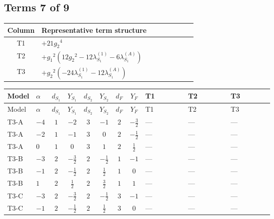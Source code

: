 \documentclass[8pt]{article}
\begin{document}
\begin{landscape}
\subsection*{Terms 7 of 9}
\begin{center}
\begin{tabular}{@{}c >{\raggedright\arraybackslash}p{0.82\linewidth}@{}}
\toprule
Column & Representative term structure \\
\midrule
T1 & \(\displaystyle +21 {g_2}^4\) \\
\midrule
T2 & \(\displaystyle +{g_1}^2 \left(12 {g_2}^2-12 {\lambda_{S_1}^{(1)}}-6 {\lambda_{S_1}^{(A)}}\right)\) \\
\midrule
T3 & \(\displaystyle +{g_2}^2 (-24 {\lambda_{S_1}^{(1)}}-12 {\lambda_{S_1}^{(A)}})\) \\
\midrule
\bottomrule
\end{tabular}
\end{center}
\smallskip
\tiny
\begin{longtable}{@{}llcccccc >{\raggedright\arraybackslash}p{0.21\linewidth} >{\raggedright\arraybackslash}p{0.21\linewidth} >{\raggedright\arraybackslash}p{0.21\linewidth}@{}}
\toprule
Model & $\alpha$ & $d_{S_1}$ & $Y_{S_1}$ & $d_{S_2}$ & $Y_{S_2}$ & $d_F$ & $Y_F$ & T1 & T2 & T3 \\
\midrule
\endfirsthead
\toprule
Model & $\alpha$ & $d_{S_1}$ & $Y_{S_1}$ & $d_{S_2}$ & $Y_{S_2}$ & $d_F$ & $Y_F$ & T1 & T2 & T3 \\
\midrule
\endhead
T3-A & $-4$ & $1$ & $-2$ & $3$ & $-1$ & $2$ & $-\frac{3}{2}$ & --- & --- & --- \\
\midrule
T3-A & $-2$ & $1$ & $-1$ & $3$ & $0$ & $2$ & $-\frac{1}{2}$ & --- & --- & --- \\
\midrule
T3-A & $0$ & $1$ & $0$ & $3$ & $1$ & $2$ & $\frac{1}{2}$ & --- & --- & --- \\
\midrule
T3-B & $-3$ & $2$ & $-\frac{3}{2}$ & $2$ & $-\frac{1}{2}$ & $1$ & $-1$ & --- & --- & --- \\
\midrule
T3-B & $-1$ & $2$ & $-\frac{1}{2}$ & $2$ & $\frac{1}{2}$ & $1$ & $0$ & --- & --- & --- \\
\midrule
T3-B & $1$ & $2$ & $\frac{1}{2}$ & $2$ & $\frac{3}{2}$ & $1$ & $1$ & --- & --- & --- \\
\midrule
T3-C & $-3$ & $2$ & $-\frac{3}{2}$ & $2$ & $-\frac{1}{2}$ & $3$ & $-1$ & --- & --- & --- \\
\midrule
T3-C & $-1$ & $2$ & $-\frac{1}{2}$ & $2$ & $\frac{1}{2}$ & $3$ & $0$ & --- & --- & --- \\

\end{longtable}
\end{landscape}
\end{document}
